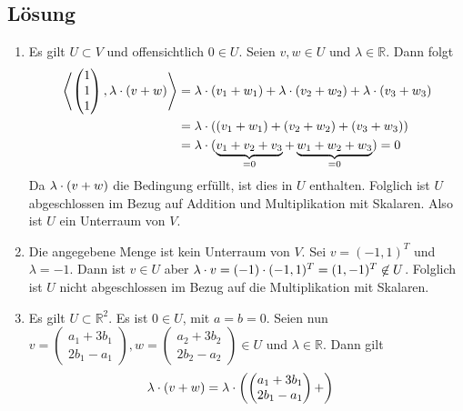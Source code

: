 \documentclass[german,12pt]{homework}
\newcommand{\RR}{\mathbb{R}}
\newcommand{\dotproduct}[2]{\left\langle#1, #2\right\rangle}
\DeclarePairedDelimiter{\enbrace}{(}{)}
\begin{document}
    \subsection*{Lösung}
    \begin{enumerate}
        \item Es gilt \(U \subset V\) und offensichtlich \(0 \in U\). Seien
        \(v, w \in U\) und \(\lambda \in \RR\). Dann folgt
        \begin{align*}
            \dotproduct{\begin{pmatrix}1\\1\\1\end{pmatrix}}{\lambda \cdot
            \enbrace*{v + w}} &= \lambda \cdot \enbrace*{v_1 + w_1} + \lambda
            \cdot \enbrace*{v_2 + w_2} + \lambda \cdot \enbrace*{v_3 + w_3}\\
            &= \lambda \cdot \enbrace*{\enbrace*{v_1 + w_1} + \enbrace*{v_2 +
            w_2} + \enbrace*{v_3 + w_3}}\\
            &= \lambda \cdot \enbrace{\underbrace{v_1 + v_2 + v_3}_{= 0} +
            \underbrace{w_1 + w_2 + w_3}_{= 0}} = 0
        \end{align*}
        Da \(\lambda \cdot \enbrace*{v + w}\) die Bedingung erfüllt, ist dies
        in \(U\) enthalten. Folglich ist \(U\) abgeschlossen im Bezug auf
        Addition und Multiplikation mit Skalaren. Also ist \(U\) ein Unterraum
        von \(V\).
        \item Die angegebene Menge ist kein Unterraum von \(V\). Sei \(v = (-1,
        1)^T\) und \(\lambda = -1\). Dann ist \(v \in U\) aber \(\lambda \cdot
        v = \enbrace*{-1} \cdot (-1, 1)^T = (1, -1)^T \not\in U\). Folglich ist
        \(U\) nicht abgeschlossen im Bezug auf die Multiplikation mit Skalaren.
        \item Es gilt \(U \subset \RR^2\). Es ist \(0 \in U\), mit \(a = b =
        0\). Seien nun \(v = \begin{pmatrix}a_1 + 3b_1\\2b_1 -
        a_1\end{pmatrix}, w = \begin{pmatrix}a_2 + 3b_2\\2b_2 -
        a_2\end{pmatrix} \in U\) und \(\lambda \in \RR\). Dann gilt
        \begin{align*}
            \lambda \cdot \enbrace*{v + w} &= \lambda \cdot
            \enbrace*{\begin{pmatrix}a_1 + 3b_1\\2b_1 - a_1\end{pmatrix} +
}
\end{align*}
\end{enumerate}
\end{document}
